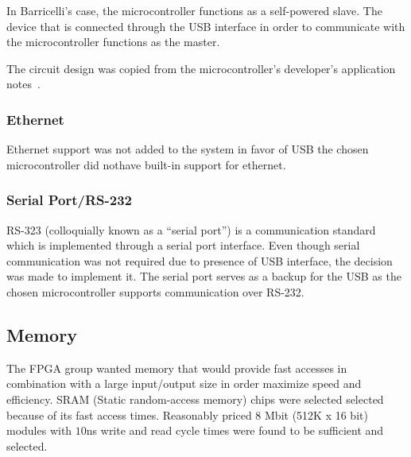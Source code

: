 In Barricelli's case, the microcontroller functions as a self-powered slave.
The device that is connected through the USB interface in order to communicate with the microcontroller functions as the master.

The circuit design was copied from the microcontroller's developer's application notes~\cite[Figure 2.2]{an0046}.


\subsubsection{Ethernet}
Ethernet support was not added to the system in favor of USB the chosen microcontroller did nothave built-in support for ethernet.


\subsubsection{Serial Port/RS-232} 
RS-323 (colloquially known as a ``serial port'') is a communication standard which is implemented through a serial port interface.
Even though serial communication was not required due to presence of USB interface, the decision was made to implement it.
The serial port serves as a backup for the USB as the chosen microcontroller supports communication over RS-232.

\subsection{Memory} \label{pcb:design-choices:ss:memory}
The FPGA group wanted memory that would provide fast accesses in combination with a large input/output size in order maximize speed and efficiency.
SRAM (Static random-access memory) chips were selected selected because of its fast access times.
Reasonably priced 8 Mbit (512K x 16 bit) modules with $10$ns write and read cycle times were found to be sufficient and selected. 

